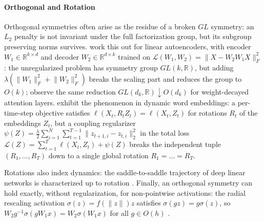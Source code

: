 \documentclass[mathematics,review,submit,moreauthors]{Definitions/mdpi}
\begin{document}
\paragraph{Orthogonal and Rotation}
Orthogonal symmetries often arise as the residue of a broken $GL$ symmetry: an $L_2$ penalty is not invariant under the full factorization group, but its subgroup preserving norms survives.
\citet{kunin2019p3icml} work this out for linear autoencoders, with encoder $W_1\in\mathbb{R}^{k\times d}$ and decoder $W_2\in\mathbb{R}^{d\times k}$ trained on $\mathcal{L}(W_1,W_2)=\lVert X-W_2W_1X\rVert_F^2$: the unregularized problem has symmetry group $GL(k,\mathbb{R})$, but adding $\lambda(\lVert W_1\rVert_F^2+\lVert W_2\rVert_F^2)$ breaks the scaling part and reduces the group to $O(k)$; \citet{kobayashi2024anips} observe the same reduction $GL(d_k,\mathbb{R})\downarrow O(d_k)$ for weight-decayed attention layers.
\citet{bamler2018p3icml} exhibit the phenomenon in dynamic word embeddings: a per-time-step objective satisfies $\ell(X_t,R_tZ_t)=\ell(X_t,Z_t)$ for rotations $R_t$ of the embeddings $Z_t$, but a coupling regularizer $\psi(Z)=\frac{\lambda}{2}\sum_{i=1}^{N}\sum_{t=1}^{T-1}\lVert z_{t+1,i}-z_{t,i}\rVert_2^2$ in the total loss $\mathcal{L}(Z)=\sum_{t=1}^{T}\ell(X_t,Z_t)+\psi(Z)$ breaks the independent tuple $(R_1,\dots,R_T)$ down to a single global rotation $R_1=\dots=R_T$.

Rotations also index dynamics: the saddle-to-saddle trajectory of deep linear networks is characterized up to rotation \citep{jacot2022}.
Finally, an orthogonal symmetry can hold exactly, without regularization, for non-pointwise activations: the radial rescaling activation $\sigma(z)=f(\lVert z\rVert)z$ satisfies $\sigma(gz)=g\sigma(z)$, so $W_2g^{-1}\sigma(gW_1x)=W_2\sigma(W_1x)$ for all $g\in O(h)$ \citep{zhao2023a}.
\end{document}
